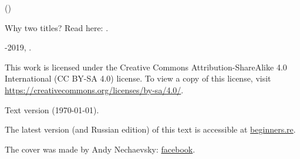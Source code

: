 ﻿\begin{titlepage}


\end{titlepage}

\newpage

\begin{center}
\vspace*{\fill}
{\LARGE \TitleMain}

\bigskip

{\large (\TitleAux)}

\bigskip
\bigskip
Why two titles? Read here: .

\vspace*{\fill}

{\large \AUTHOR}

{\large \TT{<\EMAIL>}}
\vspace*{\fill}
\vfill

\ccbysa

-2019, \AUTHOR. 

This work is licensed under the Creative Commons Attribution-ShareAlike 4.0 International (CC BY-SA 4.0) license.
To view a copy of this license, visit \url{https://creativecommons.org/licenses/by-sa/4.0/}.

Text version ({\large \today}).

The latest version (and Russian edition) of this text is accessible at \href{http://go.yurichev.com/17009}{beginners.re}.

The cover was made by Andy Nechaevsky: \href{http://go.yurichev.com/17023}{facebook}.

\end{center}

